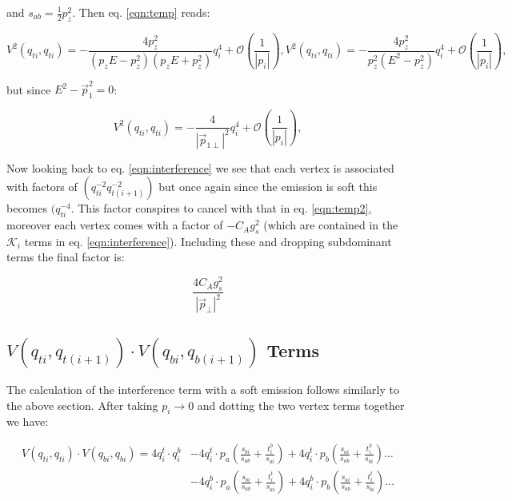 		and $s_{ab}=\frac12p_z^2$.  Then eq. \eqref{eqn:temp} reads:

		\begin{subequations}
			\begin{equation}
			V^2(q_{ti}, q_{ti}) = - \frac{4p_z^2}{(p_zE - p_z^2)(p_zE + p_z^2)}q^4_{i} + \mathcal{O}\left(\frac{1}{|p_i|}\right),
			\end{equation}
			\begin{equation}
			V^2(q_{ti}, q_{ti}) = - \frac{4p_z^2}{p_z^2(E^2-p_z^2)}q^4_{i} + \mathcal{O}\left(\frac{1}{|p_i|}\right),
			\end{equation}
		\end{subequations}

		but since $E^2-\vec{p}_1^2=0$:

		\begin{equation}
			V^2(q_{ti}, q_{ti}) = - \frac{4}{|\vec{p}_{1\perp}|^2}q^4_{i} + \mathcal{O}\left(\frac{1}{|p_i|}\right),
			\label{eqn:temp2}
		\end{equation}

		Now looking back to eq. \eqref{eqn:interference} we see that each vertex is associated with factors of
		$(q^{-2}_{ti}q^{-2}_{t(i+1)})$ but once again since the emission is soft this becomes $(q^{-4}_{ti}$.
		This factor conspires to cancel with that in eq. \eqref{eqn:temp2}, moreover each vertex comes with a
		factor of $-C_Ag^2_s$ (which are contained in the $\mathcal{K}_i$ terms in eq. \eqref{eqn:interference}).
		Including these and dropping subdominant terms the final factor is:

		\begin{equation}
			\frac{4C_Ag_s^2}{|\vec{p}_\perp|^2}
			\label{eqn:finalsoft}
		\end{equation}

	\subsection{$V(q_{ti}, q_{t(i+1)})\cdot V(q_{bi}, q_{b(i+1)})$ Terms}
	\label{sub:subsection_name}

		The calculation of the interference term with a soft emission follows similarly to the above section.
		After taking $p_i\rightarrow0$ and dotting the two vertex terms together we have:

		\begin{equation}
		\begin{split}
			V(q_{ti}, q_{ti})\cdot V(q_{bi}, q_{bi}) = 4q_i^t\cdot q_i^b &- 4q_i^t\cdot p_a\left(\frac{s_{bi}}{s_{ab}} +
				\frac{t_i^b}{s_{ai}}\right) + 4q_i^t\cdot p_b\left(\frac{s_{ai}}{s_{ab}} + \frac{t_i^b}{s_{bi}}\right) \ldots\\
				&- 4q_i^b\cdot p_a\left(\frac{s_{bi}}{s_{ab}} + \frac{t_i^t}{s_{ai}}\right) +
				4q_i^b\cdot p_b\left(\frac{s_{ai}}{s_{ab}} +
				\frac{t_i^t}{s_{bi}}\right) \ldots\\
		\end{split}
		\end{equation}

